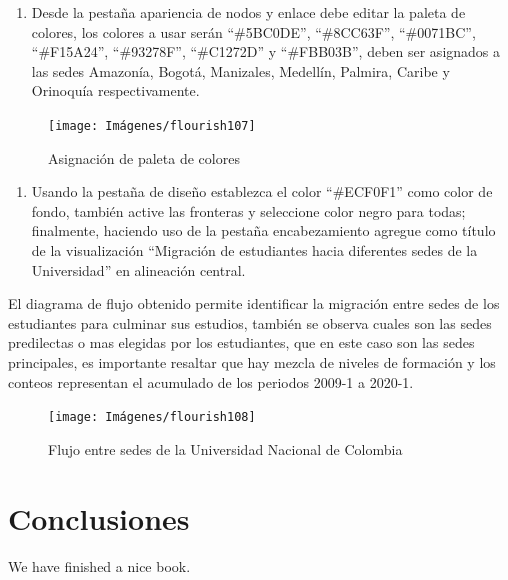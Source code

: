 \documentclass[
]{book}
\providecommand{\tightlist}{%
  \setlength{\itemsep}{0pt}\setlength{\parskip}{0pt}}
\begin{document}
\begin{enumerate}
\def\labelenumi{\arabic{enumi}.}
\setcounter{enumi}{3}
\tightlist
\item
  Desde la pestaña apariencia de nodos y enlace debe editar la paleta de colores, los colores a usar serán ``\#5BC0DE'', ``\#8CC63F'', ``\#0071BC'', ``\#F15A24'', ``\#93278F'', ``\#C1272D'' y ``\#FBB03B'', deben ser asignados a las sedes Amazonía, Bogotá, Manizales, Medellín, Palmira, Caribe y Orinoquía respectivamente.
\end{enumerate}

\begin{figure}

{\centering \texttt{[image: Imágenes/flourish107]} 

}

\caption{Asignación de paleta de colores}\label{fig:paso4sankeyflourish-fig}
\end{figure}

\begin{enumerate}
\def\labelenumi{\arabic{enumi}.}
\setcounter{enumi}{4}
\tightlist
\item
  Usando la pestaña de diseño establezca el color ``\#ECF0F1'' como color de fondo, también active las fronteras y seleccione color negro para todas; finalmente, haciendo uso de la pestaña encabezamiento agregue como título de la visualización ``Migración de estudiantes hacia diferentes sedes de la Universidad'' en alineación central.
\end{enumerate}

El diagrama de flujo obtenido permite identificar la migración entre sedes de los estudiantes para culminar sus estudios, también se observa cuales son las sedes predilectas o mas elegidas por los estudiantes, que en este caso son las sedes principales, es importante resaltar que hay mezcla de niveles de formación y los conteos representan el acumulado de los periodos 2009-1 a 2020-1.

\begin{figure}

{\centering \texttt{[image: Imágenes/flourish108]} 

}

\caption{Flujo entre sedes de la Universidad Nacional de Colombia}\label{fig:finalsankeyflourish-fig}
\end{figure}

\hypertarget{conclu}{%
\chapter{Conclusiones}\label{conclu}}

We have finished a nice book.

  
\end{document}
